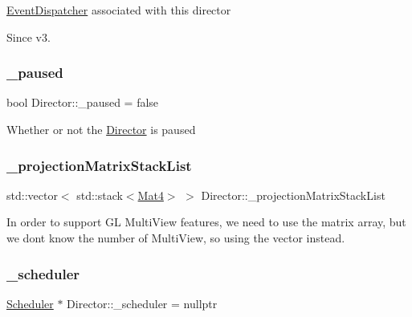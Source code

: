 \hyperlink{classEventDispatcher}{Event\+Dispatcher} associated with this director \begin{DoxySince}{Since}
v3. 
\end{DoxySince}
\mbox{\label{classDirector_a672d832da8045559f18ff63302ac2aee}} 
\subsubsection{\texorpdfstring{\+\_\+paused}{\_paused}}
{\footnotesize\ttfamily bool Director\+::\+\_\+paused = false\hspace{0.3cm}{\ttfamily [protected]}}

Whether or not the \hyperlink{classDirector}{Director} is paused \mbox{\label{classDirector_adf0f8f92f046f18003f9d947ea8536d3}} 
\subsubsection{\texorpdfstring{\+\_\+projection\+Matrix\+Stack\+List}{\_projectionMatrixStackList}}
{\footnotesize\ttfamily std\+::vector$<$ std\+::stack$<$\hyperlink{classMat4}{Mat4}$>$ $>$ Director\+::\+\_\+projection\+Matrix\+Stack\+List\hspace{0.3cm}{\ttfamily [protected]}}

In order to support GL Multi\+View features, we need to use the matrix array, but we don\textquotesingle{}t know the number of Multi\+View, so using the vector instead. \mbox{\label{classDirector_a11abf6c355682cf63df2f3b1f610fe33}} 
\subsubsection{\texorpdfstring{\+\_\+scheduler}{\_scheduler}}
{\footnotesize\ttfamily \hyperlink{classScheduler}{Scheduler} $\ast$ Director\+::\+\_\+scheduler = nullptr\hspace{0.3cm}{\ttfamily [protected]}}

